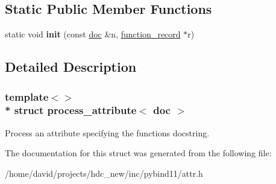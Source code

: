 \subsection*{Static Public Member Functions}
\begin{DoxyCompactItemize}
\item 
static void {\bfseries init} (const \hyperlink{structdoc}{doc} \&n, \hyperlink{structfunction__record}{function\+\_\+record} $\ast$r)\hypertarget{structprocess__attribute_3_01doc_01_4_aaa3436fb4a2436f7dbbb1d3259c17ae0}{}\label{structprocess__attribute_3_01doc_01_4_aaa3436fb4a2436f7dbbb1d3259c17ae0}

\end{DoxyCompactItemize}


\subsection{Detailed Description}
\subsubsection*{template$<$$>$\\*
struct process\+\_\+attribute$<$ doc $>$}

Process an attribute specifying the function\textquotesingle{}s docstring. 

The documentation for this struct was generated from the following file\+:\begin{DoxyCompactItemize}
\item 
/home/david/projects/hdc\+\_\+new/inc/pybind11/attr.\+h\end{DoxyCompactItemize}
